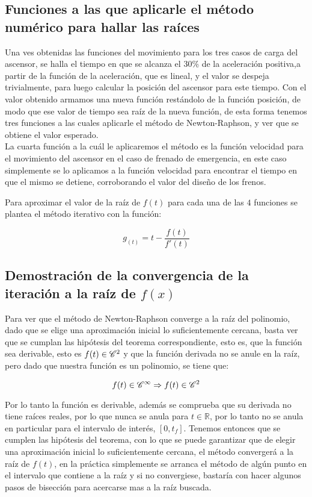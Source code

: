 
\subsection{Funciones a las que aplicarle el método numérico para hallar las raíces}


Una ves obtenidas las funciones del movimiento para los tres casos de carga del ascensor, se halla el tiempo en que se alcanza el 30\% de la aceleración positiva,a partir de la función de la aceleración, que es lineal, y el valor se despeja trivialmente, para luego calcular la posición del ascensor para este tiempo. Con el valor obtenido armamos una nueva función restándolo de la función posición, de modo que ese valor de tiempo sea raíz de la nueva función, de esta forma tenemos tres funciones a las cuales aplicarle el método de Newton-Raphson, y ver que se obtiene el valor esperado.\\
La cuarta función a la cuál le aplicaremos el método es la función velocidad para el movimiento del ascensor en el caso de frenado de emergencia, en este caso simplemente se lo aplicamos a la función velocidad para encontrar el tiempo en que el mismo se detiene, corroborando el valor del diseño de los frenos.




Para aproximar el valor de la raíz de $f(t)$ para cada una de las $4$ funciones se plantea el método iterativo con la función:


\[g_{(t)} = t - \frac{{f(t)}}{{f'(t)}}\]

\subsection{Demostración de la convergencia de la iteración a la raíz de $f(x)$}

Para ver que el método de Newton-Raphson converge a la raíz del polinomio, dado que se elige una aproximación inicial lo suficientemente cercana, basta ver que se cumplan las hipótesis del teorema correspondiente, esto es, que la función sea derivable, esto es $f(t) \in {\rm{ }}\mathscr{C}^{2}$ y que la función derivada no se anule en la raíz, pero dado que nuestra función es un polinomio, se tiene que:

\[
f(t) \in {\rm{ }}\mathscr{C}^{\infty} \Rightarrow f(t) \in {\rm{ }}\mathscr{C}^{2}
\]

Por lo tanto la función es derivable, además se comprueba que su derivada no tiene raíces reales, por lo que nunca se anula para $t \in \mathbb{R}$, por lo tanto no se anula en particular para el intervalo de interés, $[0, t_{f}]$. Tenemos entonces que se cumplen las hipótesis del teorema, con lo que se puede garantizar que de elegir una aproximación inicial lo suficientemente cercana, el método convergerá a la raíz de $f(t)$, en la práctica simplemente se arranca el método de algún punto en el intervalo que contiene a la raíz y si no convergiese, bastaría con hacer algunos pasos de bisección para acercarse mas a la raíz buscada.


